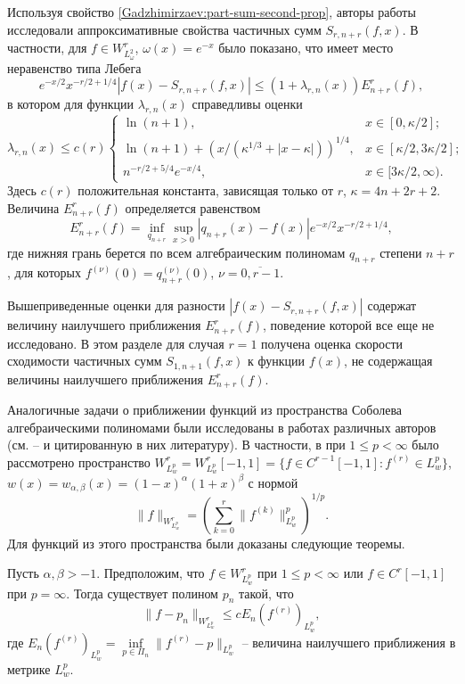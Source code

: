 Используя свойство \eqref{Gadzhimirzaev:part-sum-second-prop}, авторы работы \cite{Gadzhimirzaev:ShII-MMG} исследовали аппроксимативные свойства частичных сумм $S_{r,n+r}(f,x)$. В частности, для $f\in W^r_{L^2_\omega}$, $\omega(x)=e^{-x}$ было показано,
что имеет место неравенство типа Лебега~\cite[теорема 5.2]{Gadzhimirzaev:ShII-MMG}
$$
e^{-x/2}x^{-r/2+1/4}|f(x)-S_{r,n+r}(f,x)|\le (1+\lambda_{r,n}(x))E_{n+r}^r(f),
$$
в котором для функции $\lambda_{r,n}(x)$ справедливы оценки
$$
\lambda_{r,n}(x)\le c(r)
\begin{cases}
	\ln(n+1), & x\in[0,\kappa/2]; \\
	\ln(n+1)+(x/(\kappa^{1/3}+|x-\kappa|))^{1/4}, & x\in[\kappa/2,3\kappa/2]; \\
	n^{-r/2+5/4}e^{-x/4}, & x\in[3\kappa/2,\infty).
\end{cases}
$$
Здесь $c(r)$ положительная константа, зависящая только от $r$, $\kappa=4n+2r+2$.
Величина $E_{n+r}^r(f)$ определяется равенством
$$
E_{n+r}^r(f)=\inf_{q_{n+r}}\sup_{x>0}|q_{n+r}(x)-f(x)|e^{-x/2}x^{-r/2+1/4},
$$
где нижняя грань берется по всем алгебраическим полиномам $q_{n+r}$ степени $n+r$, для которых $f^{(\nu)}(0)=q_{n+r}^{(\nu)}(0)$, $\nu=\overline{0,r-1}$.

Вышеприведенные оценки для разности $|f(x)-S_{r,n+r}(f,x)|$ содержат величину наилучшего приближения $E_{n+r}^r(f)$, поведение которой все еще не исследовано. В этом разделе для случая $r=1$ получена оценка скорости сходимости частичных сумм $S_{1,n+1}(f,x)$ к функции $f(x)$, не содержащая величины наилучшего приближения $E_{n+r}^r(f)$.

Аналогичные задачи о приближении функций из пространства Соболева алгебраическими полиномами были исследованы в работах различных авторов
(см. \cite{Approx-Xu}--\cite{Approx-Leonardo} и цитированную в них литературу). В частности, в \cite{Approx-Xu} при $1\le p<\infty$ было рассмотрено пространство $W^r_{L^p_w}=W^r_{L^p_w}[-1,1]=\{f\in C^{r-1}[-1,1]: f^{(r)}\in L^p_w\}$, $w(x)=w_{\alpha,\beta}(x)=(1-x)^\alpha(1+x)^\beta$ с нормой
$$
\|f\|_{W^r_{L^p_w}}=\left(\sum_{k=0}^{r}\|f^{(k)}\|^p_{L^p_w}\right)^{1/p}.
$$
Для функций из этого пространства были доказаны следующие теоремы.

\begin{theoremA}
	Пусть $\alpha,\beta>-1$. Предположим, что $f\in W^r_{L^p_w}$ при $1\le p<\infty$ или $f\in C^r[-1,1]$ при $p=\infty$. Тогда существует полином $p_n$ такой, что
	$$
	\|f-p_n\|_{W^r_{L^p_w}}\le c E_n(f^{(r)})_{L^p_w},
	$$
	где $E_n(f^{(r)})_{L^p_w}=\inf\limits_{p\in\Pi_n}\|f^{(r)}-p\|_{L^p_w}$ -- величина наилучшего приближения в метрике $L^p_w$.
\end{theoremA}

